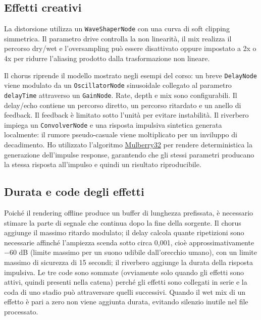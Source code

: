 \documentclass[11pt,a4paper]{article}
\begin{document}
	\subsection{Effetti creativi}
	
	La distorsione utilizza un \texttt{WaveShaperNode} con una curva di soft clipping simmetrica. Il parametro drive controlla la non linearità, il mix realizza il percorso dry/wet e l'oversampling può essere disattivato oppure impostato a 2x o 4x per ridurre l'aliasing prodotto dalla trasformazione non lineare.
	
	Il chorus riprende il modello mostrato negli esempi del corso: un breve \texttt{DelayNode} viene modulato da un \texttt{OscillatorNode} sinusoidale collegato al parametro \texttt{delayTime} attraverso un \texttt{GainNode}. Rate, depth e mix sono configurabili. Il delay/echo contiene un percorso diretto, un percorso ritardato e un anello di feedback. Il feedback è limitato sotto l'unità per evitare instabilità. Il riverbero impiega un \texttt{ConvolverNode} e una risposta impulsiva sintetica generata localmente: il rumore pseudo-casuale viene moltiplicato per un inviluppo di decadimento. Ho utilizzato l'algoritmo \href{https://emanueleferonato.com/2026/01/08/understanding-how-to-use-mulberry32-to-achieve-deterministic-randomness-in-javascript/}{Mulberry32} per rendere deterministica la generazione dell'impulse response, garantendo che gli stessi parametri producano la stessa risposta all'impulso e quindi un risultato riproducibile.
	
	\subsection{Durata e code degli effetti}
	
	Poiché il rendering offline produce un buffer di lunghezza prefissata, è necessario stimare la parte di segnale che continua dopo la fine della sorgente. Il chorus aggiunge il massimo ritardo modulato; il delay calcola quante ripetizioni sono necessarie affinché l'ampiezza scenda sotto circa 0,001, cioè approssimativamente $-60$ dB (limite massimo per un suono udibile dall'orecchio umano), con un limite massimo di sicurezza di 15 secondi; il riverbero aggiunge la durata della risposta impulsiva. Le tre code sono sommate (ovviamente solo quando gli effetti sono attivi, quindi presenti nella catena) perché gli effetti sono collegati in serie e la coda di uno stadio può attraversare quelli successivi. Quando il wet mix di un effetto è pari a zero non viene aggiunta durata, evitando silenzio inutile nel file processato.
	
\end{document}
